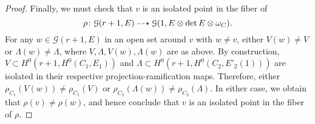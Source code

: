 \documentclass[11pt,reqno]{amsart}
\theoremstyle{plain}
\theoremstyle{definition}
\theoremstyle{remark}
\numberwithin{equation}{section}
\renewcommand{\to}{{\longrightarrow}}
\numberwithin{equation}{section}
\renewcommand{\O}{\mathcal O}
\begin{document}
\begin{proof}
  Finally, we must check that $v$ is an isolated point in the fiber of
  \[ \rho {\colon} \mathcal G(r+1, E) \dashrightarrow \mathcal G(1, E \otimes \det E \otimes \omega_C).\]
  For any $w \in \mathcal G(r+1, E)$ in an open set around $v$ with $w \neq v$, either $V(w) \neq V$ or $\Lambda(w) \neq \Lambda$, where $V, \Lambda, V(w), \Lambda(w)$ are as above.
  By construction, $V \subset H^0(r+1, H^0(C_1, E_1))$ and $\Lambda \subset H^0(r+1, H^0(C_2, E'_2(1)))$ are isolated in their respective projection-ramification maps.
  Therefore, either $\rho_{C_1} (V(w)) \neq \rho_{C_1}(V)$ or $\rho_{C_2}(\Lambda(w)) \neq \rho_{C_2}(\Lambda)$.
  In either case, we obtain that $\rho(v) \neq \rho(w)$, and hence conclude that $v$ is an isolated point in the fiber of $\rho$.
\end{proof}




\end{document}

